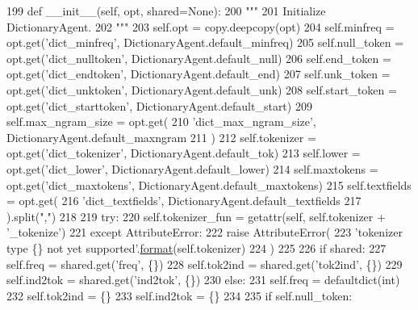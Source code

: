 \begin{DoxyCode}
199     \textcolor{keyword}{def }\_\_init\_\_(self, opt, shared=None):
200         \textcolor{stringliteral}{"""}
201 \textcolor{stringliteral}{        Initialize DictionaryAgent.}
202 \textcolor{stringliteral}{        """}
203         self.opt = copy.deepcopy(opt)
204         self.minfreq = opt.get(\textcolor{stringliteral}{'dict\_minfreq'}, DictionaryAgent.default\_minfreq)
205         self.null\_token = opt.get(\textcolor{stringliteral}{'dict\_nulltoken'}, DictionaryAgent.default\_null)
206         self.end\_token = opt.get(\textcolor{stringliteral}{'dict\_endtoken'}, DictionaryAgent.default\_end)
207         self.unk\_token = opt.get(\textcolor{stringliteral}{'dict\_unktoken'}, DictionaryAgent.default\_unk)
208         self.start\_token = opt.get(\textcolor{stringliteral}{'dict\_starttoken'}, DictionaryAgent.default\_start)
209         self.max\_ngram\_size = opt.get(
210             \textcolor{stringliteral}{'dict\_max\_ngram\_size'}, DictionaryAgent.default\_maxngram
211         )
212         self.tokenizer = opt.get(\textcolor{stringliteral}{'dict\_tokenizer'}, DictionaryAgent.default\_tok)
213         self.lower = opt.get(\textcolor{stringliteral}{'dict\_lower'}, DictionaryAgent.default\_lower)
214         self.maxtokens = opt.get(\textcolor{stringliteral}{'dict\_maxtokens'}, DictionaryAgent.default\_maxtokens)
215         self.textfields = opt.get(
216             \textcolor{stringliteral}{'dict\_textfields'}, DictionaryAgent.default\_textfields
217         ).split(\textcolor{stringliteral}{","})
218 
219         \textcolor{keywordflow}{try}:
220             self.tokenizer\_fun = getattr(self, self.tokenizer + \textcolor{stringliteral}{'\_tokenize'})
221         \textcolor{keywordflow}{except} AttributeError:
222             \textcolor{keywordflow}{raise} AttributeError(
223                 \textcolor{stringliteral}{'tokenizer type \{\} not yet supported'}.\hyperlink{namespaceparlai_1_1chat__service_1_1services_1_1messenger_1_1shared__utils_a32e2e2022b824fbaf80c747160b52a76}{format}(self.tokenizer)
224             )
225 
226         \textcolor{keywordflow}{if} shared:
227             self.freq = shared.get(\textcolor{stringliteral}{'freq'}, \{\})
228             self.tok2ind = shared.get(\textcolor{stringliteral}{'tok2ind'}, \{\})
229             self.ind2tok = shared.get(\textcolor{stringliteral}{'ind2tok'}, \{\})
230         \textcolor{keywordflow}{else}:
231             self.freq = defaultdict(int)
232             self.tok2ind = \{\}
233             self.ind2tok = \{\}
234 
235             \textcolor{keywordflow}{if} self.null\_token:

\end{DoxyCode}
